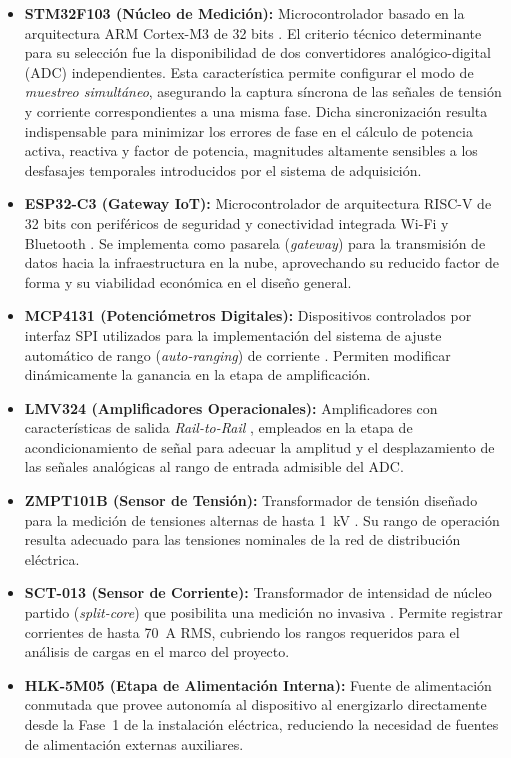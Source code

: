 \documentclass[12pt, a4paper]{article} %
\begin{document}
\begin{itemize}
  \item \textbf{STM32F103 (Núcleo de Medición):} Microcontrolador basado en la arquitectura ARM Cortex-M3 de 32 bits \cite{st_rm0008}. El criterio técnico determinante para su selección fue la disponibilidad de dos convertidores analógico-digital (ADC) independientes. Esta característica permite configurar el modo de \textit{muestreo simultáneo}, asegurando la captura síncrona de las señales de tensión y corriente correspondientes a una misma fase. Dicha sincronización resulta indispensable para minimizar los errores de fase en el cálculo de potencia activa, reactiva y factor de potencia, magnitudes altamente sensibles a los desfasajes temporales introducidos por el sistema de adquisición.
  \item \textbf{ESP32-C3 (Gateway IoT):} Microcontrolador de arquitectura RISC-V de 32 bits con periféricos de seguridad y conectividad integrada Wi-Fi y Bluetooth \cite{esp32c3_ds}. Se implementa como pasarela (\textit{gateway}) para la transmisión de datos hacia la infraestructura en la nube, aprovechando su reducido factor de forma y su viabilidad económica en el diseño general.
  \item \textbf{MCP4131 (Potenciómetros Digitales):} Dispositivos controlados por interfaz SPI utilizados para la implementación del sistema de ajuste automático de rango (\textit{auto-ranging}) de corriente \cite{mcp4131_ds}. Permiten modificar dinámicamente la ganancia en la etapa de amplificación.
  \item \textbf{LMV324 (Amplificadores Operacionales):} Amplificadores con características de salida \textit{Rail-to-Rail} \cite{lmv324_ds}, empleados en la etapa de acondicionamiento de señal para adecuar la amplitud y el desplazamiento de las señales analógicas al rango de entrada admisible del ADC.
  \item \textbf{ZMPT101B (Sensor de Tensión):} Transformador de tensión diseñado para la medición de tensiones alternas de hasta \qty{1}{\kilo\volt} \cite{zmpt101b_ds}. Su rango de operación resulta adecuado para las tensiones nominales de la red de distribución eléctrica.
  \item \textbf{SCT-013 (Sensor de Corriente):} Transformador de intensidad de núcleo partido (\textit{split-core}) que posibilita una medición no invasiva \cite{sct013_ds}. Permite registrar corrientes de hasta \qty{70}{\ampere} RMS, cubriendo los rangos requeridos para el análisis de cargas en el marco del proyecto.
  
  \item \textbf{HLK-5M05 (Etapa de Alimentación Interna):} Fuente de alimentación conmutada \cite{hlk5m05_ds} que provee autonomía al dispositivo al energizarlo directamente desde la Fase~1 de la instalación eléctrica, reduciendo la necesidad de fuentes de alimentación externas auxiliares.
\end{itemize}
\end{document}
